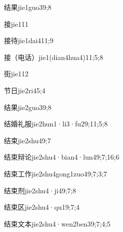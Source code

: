 \begin{verbete}{结果}{jie1guo3}{9;8}
\end{verbete}
\begin{verbete}{接}{jie1}{11}
\end{verbete}
\begin{verbete}{接待}{jie1dai4}{11;9}
\end{verbete}
\begin{verbete}{接（电话）}{jie1(dian4hua4)}{11;5;8}
\end{verbete}
\begin{verbete}{街}{jie1}{12}
\end{verbete}
\begin{verbete}{节日}{jie2ri4}{5;4}
\end{verbete}
\begin{verbete}{结果}{jie2guo3}{9;8}
\end{verbete}
\begin{verbete}{结婚礼服}{jie2hun1·li3·fu2}{9;11;5;8}
\end{verbete}
\begin{verbete}{结束}{jie2shu4}{9;7}
\end{verbete}
\begin{verbete}{结束辩论}{jie2shu4·bian4·lun4}{9;7;16;6}
\end{verbete}
\begin{verbete}{结束工作}{jie2shu4gong1zuo4}{9;7;3;7}
\end{verbete}
\begin{verbete}{结束剂}{jie2shu4·ji4}{9;7;8}
\end{verbete}
\begin{verbete}{结束区}{jie2shu4·qu1}{9;7;4}
\end{verbete}
\begin{verbete}{结束文本}{jie2shu4·wen2ben3}{9;7;4;5}
\end{verbete}
